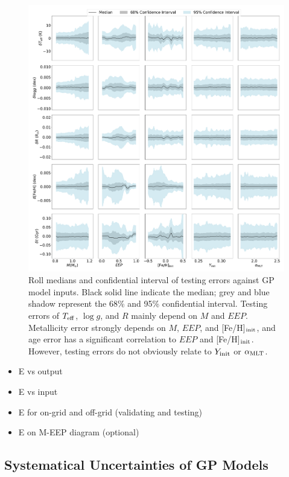\begin{figure}
	\includegraphics[width=2.0\columnwidth]{ 5d-testing_vs_inputs.pdf}
    \caption{ Roll medians and confidential interval of testing errors against GP model  inputs. Black solid line indicate the median; grey and blue shadow represent the 68\% and 95\% confidential interval. Testing errors of $T_{\rm eff}$, $\log g$, and $R$ mainly depend on $M$ and $EEP$. Metallicity error strongly depends on $M$, $EEP$, and [Fe/H]$_{\rm init}$, and age error has a significant correlation to $EEP$ and [Fe/H]$_{\rm init}$. However, testing errors do not obviously relate to $Y_{\rm init}$ or $\alpha_{\rm MLT}$. } 
  \label{fig:5d_test_vs_input}
\end{figure}


\begin{itemize}
\item E vs output
\item E vs input 
\item E for on-grid and off-grid (validating and testing)
\item E on M-EEP diagram (optional)
\end{itemize}


\subsection{Systematical Uncertainties of GP Models}\label{sec:sys}



